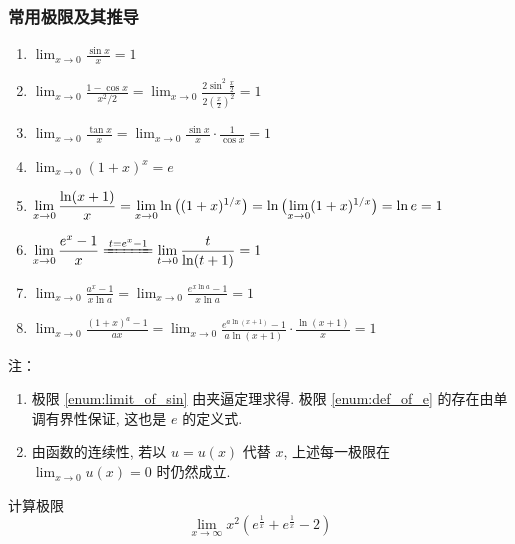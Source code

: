 \subsubsection{常用极限及其推导}
\begin{enumerate}
    \item $\displaystyle \lim_{x \to 0} \frac{\sin x}{x} = 1$ \label{enum:limit_of_sin}
    
    \item $\displaystyle \lim_{x \to 0} \frac{1 - \cos x}{x^2 / 2} = \lim_{x \to 0} \frac{2\sin^2\frac x2}{2 (\frac x2)^2} = 1$
    
    \item $\displaystyle \lim_{x \to 0} \frac{\tan x}{x} = \lim_{x \to 0} \frac{\sin x}{x} \cdot \frac{1}{\cos x} = 1$
    
    \item $\displaystyle \lim_{x \to 0} (1 + x)^x = e$ \label{enum:def_of_e}
    
    \item $\displaystyle \lim_{x \to 0} \frac{\ln(x + 1)}{x} = \lim_{x \to 0} \ln \del[1]{(1 + x)^{1/x}} = \ln \del[1]{\lim_{x \to 0} (1 + x)^{1/x}} = \ln e = 1$
    
    \item $\displaystyle \lim_{x \to 0} \frac{e^x - 1}{x} \xlongequal{t = e^x - 1} \lim_{t \to 0} \frac{t}{\ln(t + 1)} = 1$
    
    \item $\displaystyle \lim_{x \to 0} \frac{a^x - 1}{x \ln a} = \lim_{x \to 0} \frac{e^{x \ln a} - 1}{x \ln a} = 1$
    
    \item $\displaystyle \lim_{x \to 0} \frac{(1 + x)^a - 1}{ax} = \lim_{x \to 0} \frac{e^{a \ln(x + 1)} - 1}{a \ln(x + 1)} \cdot \frac{\ln(x + 1)}{x} = 1$    
\end{enumerate}
注：\begin{enumerate}
    \item 极限 \eqref{enum:limit_of_sin} 由夹逼定理求得. 极限 \eqref{enum:def_of_e} 的存在由单调有界性保证, 这也是 $e$ 的定义式. 
    
    \item 由函数的连续性, 若以 $u = u(x)$ 代替 $x$, 上述每一极限在 $\lim_{x \to 0} u(x) = 0$ 时仍然成立.
\end{enumerate}

\begin{exercise}[利用常用极限]
    计算极限
    \[
        \lim_{x \to \infty} x^2(e^{\frac 1x} + e^{\frac 1x} - 2)
    \]
\end{exercise}

